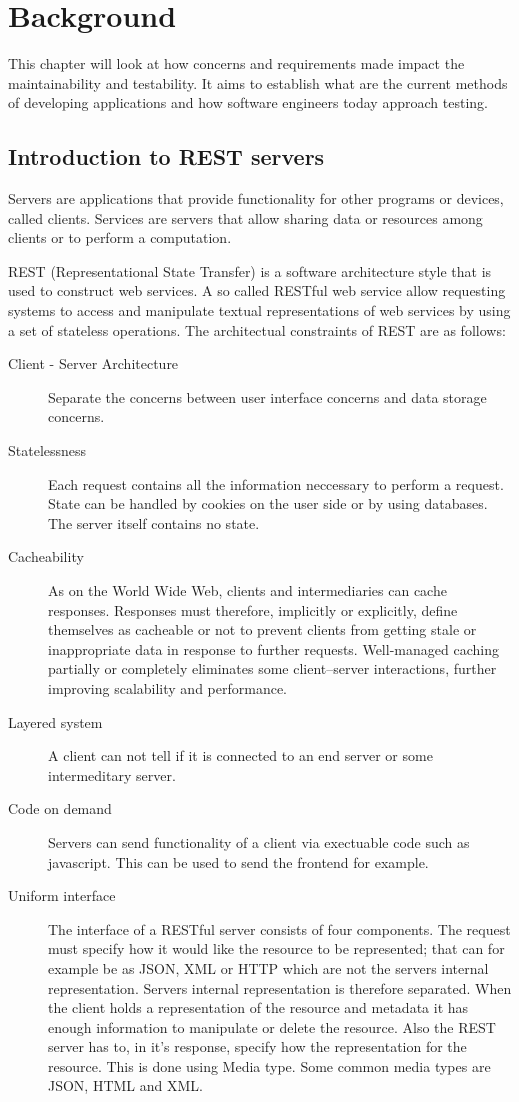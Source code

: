 \chapter{Background}\label{background}

This chapter will look at how concerns and requirements made impact the
maintainability and testability. It aims to establish what are the current
methods of developing applications and how software engineers today approach
testing. 


\section{Introduction to REST servers}

Servers are applications that provide functionality for other programs or
devices, called clients. Services are servers that allow sharing data or
resources among clients or to perform a computation.

REST (Representational State Transfer) is a software architecture style that is
used to construct web services. A so called RESTful web service allow requesting
systems to access and manipulate textual representations of web services by
using a set of stateless operations. The architectual constraints of REST are as
follows:

\begin{description}
\item[ Client - Server Architecture ] Separate the concerns between user
interface concerns and data storage concerns.
\item[Statelessness] Each request contains all the information neccessary to
perform a request. State can be handled by cookies on the user side or by using
databases. The server itself contains no state.
\item[Cacheability] As on the World Wide Web, clients and intermediaries can
cache responses. Responses must therefore, implicitly or explicitly, define
themselves as cacheable or not to prevent clients from getting stale or
inappropriate data in response to further requests. Well-managed caching
partially or completely eliminates some client–server interactions, further
improving scalability and performance. 
\item[Layered system] A client can not tell if it is connected to an end server
or some intermeditary server. 
\item[Code on demand] Servers can send functionality of a client via exectuable
code such as javascript. This can be used to send the frontend for example.
\item[Uniform interface] The interface of a RESTful server consists of four
components. The request must specify how it would like the resource to be
represented; that can for example be as JSON, XML or HTTP which are not the
servers internal representation. Servers internal representation is therefore
separated. When the client holds a representation of the resource and metadata
it has enough information to manipulate or delete the resource. Also the REST
server has to, in it's response, specify how the representation for the
resource. This is done using Media type. Some common media types are JSON, HTML
and XML.
\end{description}


